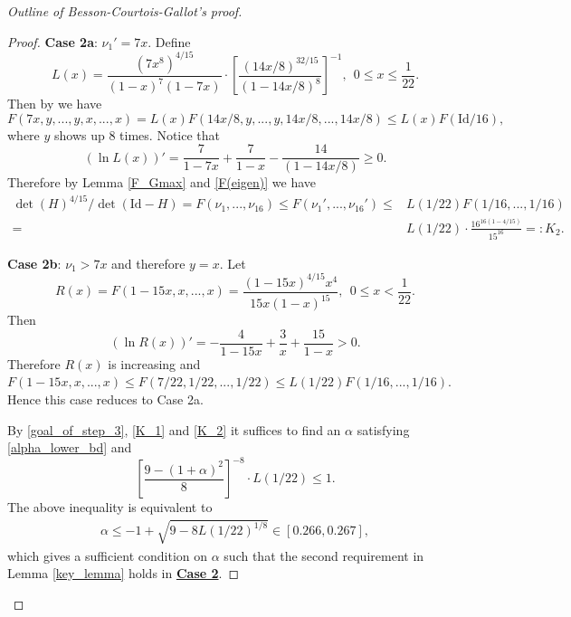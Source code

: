 \documentclass{article}
\newcommand{\id}{\mathrm{Id}}
\theoremstyle{definition}
\begin{document}
\begin{proof}[Outline of Besson-Courtois-Gallot's proof]
\begin{proof}
\textbf{Case 2a}: $\nu_1'=7x$. Define 
$$L(x)=\frac{(7x^8)^{4/15}}{(1-x)^7(1-7x)}\cdot\left[\frac{(14x/8)^{32/15}}{(1-14x/8)^8}\right]^{-1},~~0\leq x\leq \frac{1}{22}.$$
Then by \cite[B.4 Lemme]{BCG1} we have
$$F(7x,y,...,y,x,...,x)=L(x)F(14x/8,y,...,y,14x/8,...,14x/8)\leq L(x)F(\id/16),$$
where $y$ shows up $8$ times. Notice that
$$\left(\ln L(x)\right)'=\frac{7}{1-7x}+\frac{7}{1-x}-\frac{14}{(1-14x/8)}\geq 0.$$
Therefore by Lemma \ref{F_Gmax} and \eqref{F(eigen)} we have
\begin{align}\label{K_2}\det(H)^{4/15}/\det(\id-H)=F(\nu_1,...,\nu_{16})\leq F(\nu_1',...,\nu_{16}')\leq& L(1/22)F(1/16,...,1/16) \nonumber\\=&L(1/22)\cdot\frac{16^{16(1-4/15)}}{15^{16}}=:K_2.\end{align}

\textbf{Case 2b}: $\nu_1>7x$ and therefore $y=x$. Let 
$$R(x)=F(1-15x,x,...,x)=\frac{(1-15x)^{4/15}x^{4}}{15x(1-x)^{15}},~~0\leq x<\frac{1}{22}.$$
Then
$$(\ln R(x))'=-\frac{4}{1-15x}+\frac{3}{x}+\frac{15}{1-x}>0.$$
Therefore $R(x)$ is increasing and $F(1-15x,x,...,x)\leq F(7/22,1/22,...,1/22)\leq L(1/22)F(1/16,...,1/16)$. Hence this case reduces to Case 2a.

By \eqref{goal_of_step_3}, \eqref{K_1} and \eqref{K_2} it suffices to find an $\alpha$ satisfying \eqref{alpha_lower_bd} and
$$\left[\frac{9-(1+\alpha)^2}{8}\right]^{-8}\cdot L(1/22)\leq 1.$$
The above inequality is equivalent to
\begin{align}\label{alpha_upper_bd}
\alpha\leq-1+\sqrt{9-8L(1/22)^{1/8}}\in [0.266,0.267],
\end{align}
which gives a sufficient condition on $\alpha$ such that the second requirement in Lemma \ref{key_lemma} holds in \textbf{\hyperlink{case2}{Case 2}}.


\end{proof}
\end{proof}
\end{document}
